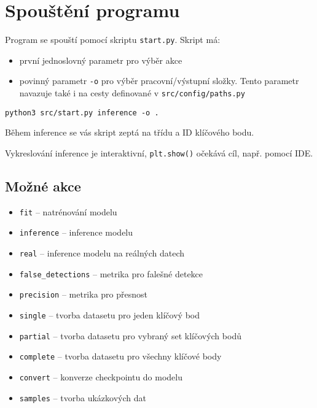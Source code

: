 \section{Spouštění programu}
Program se spouští pomocí skriptu \texttt{start.py}. Skript má:
\begin{itemize}
    \item první jednoslovný parametr pro výběr akce
    \item povinný parametr \texttt{-o} pro výběr pracovní/výstupní složky. Tento parametr navazuje také i na cesty definované v \texttt{src/config/paths.py}
\end{itemize}
\begin{verbatim}
python3 src/start.py inference -o .
\end{verbatim}

Během inference se vás skript zeptá na třídu a ID klíčového bodu.

Vykreslování inference je interaktivní, \texttt{plt.show()} očekává cíl, např. pomocí IDE.

\subsection{Možné akce}
\begin{itemize}
    \item \texttt{fit} -- natrénování modelu
    \item \texttt{inference} -- inference modelu
    \item \texttt{real} -- inference modelu na reálných datech
    \item \texttt{false\_detections} -- metrika pro falešné detekce
    \item \texttt{precision} -- metrika pro přesnost
    \item \texttt{single} -- tvorba datasetu pro jeden klíčový bod
    \item \texttt{partial} -- tvorba datasetu pro vybraný set klíčových bodů
    \item \texttt{complete} -- tvorba datasetu pro všechny klíčové body
    \item \texttt{convert} -- konverze checkpointu do modelu
    \item \texttt{samples} -- tvorba ukázkových dat
\end{itemize}

\endinput